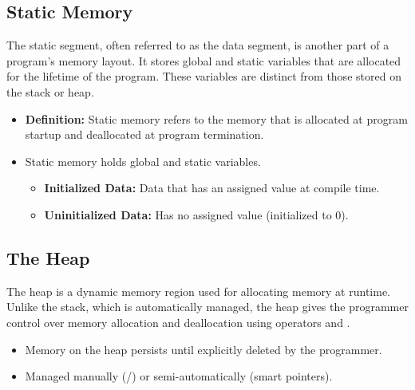 \documentclass{article}
\begin{document}
\subsection{Static Memory}

\noindent
The static segment, often referred to as the data segment, is another part of a program's memory layout. It stores global and static variables that are allocated for the lifetime of the program. These variables are distinct from those stored on the stack or heap.

\noindent
\begin{itemize}
	\item\textbf{Definition:} Static memory refers to the memory that is allocated at program startup and deallocated at program termination.

	\item Static memory holds global and static variables.
	\begin{itemize}
		\item\textbf{Initialized Data:} Data that has an assigned value at compile time.
		\item\textbf{Uninitialized Data:} Has no assigned value (initialized to 0).
	\end{itemize}
\end{itemize}

\subsection{The Heap}

\noindent
The heap is a dynamic memory region used for allocating memory at runtime. Unlike the stack, which is automatically managed, the heap gives the programmer control over memory allocation and deallocation using operators  and .

\begin{itemize}
	\item Memory on the heap persists until explicitly deleted by the programmer.
	\item Managed manually (/) or semi-automatically (smart pointers).
\end{itemize}
\end{document}
